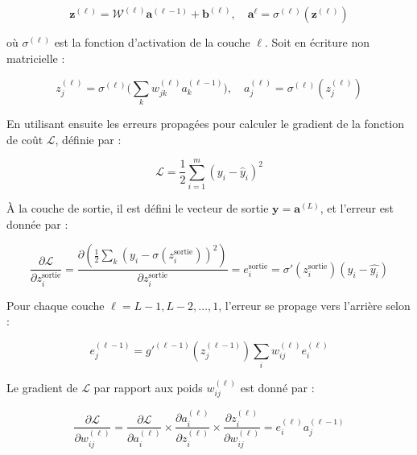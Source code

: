 \begin{equation}
\mathbf{z}^{(\ell)} = \mathbf{\mathcal{W}}^{(\ell)} \mathbf{a}^{(\ell-1)} + \mathbf{b}^{(\ell)}, \quad  \mathbf{a}^{\ell}=\sigma^{(\ell)}\left(\mathbf{z}^{(\ell)}\right)
\end{equation}

où \( \sigma^{(\ell)} \) est la fonction d’activation de la couche \( \ell \). Soit en écriture non matricielle : 

\begin{equation}
     z_{j}^{(\ell)}=\sigma^{(\ell)}{\Big (}\sum _{k}w_{jk}^{(\ell)}a_{k}^{(\ell-1)}{\Big )},
\quad  a_{j}^{(\ell)}=\sigma^{(\ell)}\left(z_{j}^{(\ell)} \right )
\end{equation}

En utilisant ensuite les erreurs propagées pour calculer le gradient de la fonction de coût \( \mathcal{L} \), définie par :

\begin{equation}
\mathcal{L} = \frac{1}{2} \sum_{i=1}^{m} \left( y_i - \widehat{y}_i \right)^2
\end{equation}

À la couche de sortie, il est défini le vecteur de sortie \( \mathbf{y} = \mathbf{a}^{(L)} \), et l'erreur est donnée par :

\begin{equation}
\frac{\partial \mathcal{L}}{\partial z_i^{\text{sortie}}} = \frac{\partial \displaystyle{\left (\frac{1}{2}  \sum_{k} \left ( y_i-\sigma(z_i^{\text{sortie}}) \right )^2 \right )}}{\partial z_i^{\text{sortie}}}
=e_i^{\text{sortie}} = \sigma'(z_i^{\text{sortie}})(y_i-\widehat{y_i})
\end{equation}

Pour chaque couche \( \ell = L-1, L-2, \dots, 1 \), l'erreur se propage vers l’arrière selon :

\begin{equation}
{\displaystyle e_{j}^{(\ell-1)}=g'^{(\ell-1)}(z_{j}^{(\ell-1)})\sum _{i}w_{ij}^{(\ell)}e_{i}^{(\ell)}}
\end{equation}

Le gradient de \( \mathcal{L} \) par rapport aux poids \( w_{ij}^{(\ell)} \) est donné par :

\begin{equation}
\frac{\partial \mathcal{L}}{\partial w_{ij}^{(\ell)}} 
=
\frac{\partial \mathcal{L}}{\partial a^{(\ell)}_i} \times \frac{\partial a^{(\ell)}_i}{\partial z_i^{(\ell)}} \times \frac{\partial z_i^{(\ell)}}{\partial w_{ij}^{(\ell)}}
= e_i^{(\ell)} a_j^{(\ell-1)}
\end{equation}

